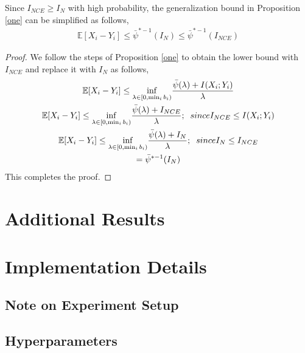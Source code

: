 \documentclass{article}
\begin{document}
\begin{customthm}{4}
  Since $I_{NCE} \geq I_{N}$ with high probability, the generalization bound in Proposition \autoref{one} can be simplified as follows,
  \begin{gather}
    \mathbb{E}[X_{i} - Y_{i}] \leq \bar{\psi}^{*-1}(I_{N}) \leq \bar{\psi}^{*-1}(I_{NCE}) \nonumber
  \end{gather} 
\end{customthm}
\begin{proof}
  We follow the steps of Proposition \autoref{one} to obtain the lower bound with $I_{NCE}$ and replace it with $I_{N}$ as follows,
  \begin{gather}
    \mathbb{E}[X_{i} - Y_{i}] \leq \underset{\lambda \in [0,\min_{i}b_{i})}{\inf} \frac{\bar{\psi}(\lambda)+I(X_{i};Y_{i})}{\lambda} \nonumber \\
    \mathbb{E}[X_{i} - Y_{i}] \leq \underset{\lambda \in [0,\min_{i}b_{i})}{\inf} \frac{\bar{\psi}(\lambda)+I_{NCE}}{\lambda}; \;\text\;{since} I_{NCE} \leq I(X_{i};Y_{i}) \nonumber\\
    \mathbb{E}[X_{i} - Y_{i}] \leq \underset{\lambda \in [0,\min_{i}b_{i})}{\inf} \frac{\bar{\psi}(\lambda)+I_{N}}{\lambda}; \;\text\;{since} I_{N} \leq I_{NCE} \nonumber\\
    = \bar{\psi}^{*-1}(I_{N}) \nonumber
  \end{gather}
  This completes the proof.

\end{proof}

\section{Additional Results}

\section{Implementation Details}

\subsection{Note on Experiment Setup}

\subsection{Hyperparameters}
\end{document}
